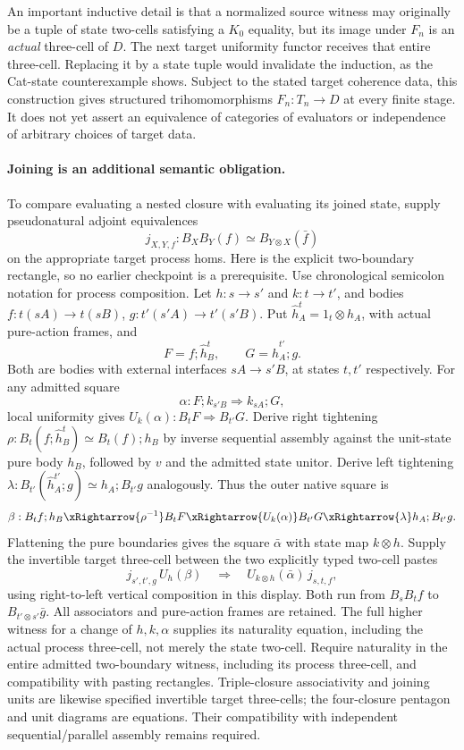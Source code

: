 \documentclass{article}
\begin{document}
An important inductive detail is that a normalized source witness may originally be a tuple of state two-cells satisfying a $K_0$ equality, but its image under $F_n$ is an \emph{actual} three-cell of $D$. The next target uniformity functor receives that entire three-cell. Replacing it by a state tuple would invalidate the induction, as the Cat-state counterexample shows. Subject to the stated target coherence data, this construction gives structured trihomomorphisms $F_n:T_n\to D$ at every finite stage. It does not yet assert an equivalence of categories of evaluators or independence of arbitrary choices of target data.

\paragraph{Joining is an additional semantic obligation.} To compare evaluating a nested closure with evaluating its joined state, supply pseudonatural adjoint equivalences
\[
 j_{X,Y,f}:B_XB_Y(f)\simeq B_{Y\otimes X}(\bar f)
\]
on the appropriate target process homs. Here is the explicit two-boundary rectangle, so no earlier checkpoint is a prerequisite. Use chronological semicolon notation for process composition. Let $h:s\to s'$ and $k:t\to t'$, and bodies $f:t(sA)\to t(sB)$, $g:t'(s'A)\to t'(s'B)$. Put $\widehat h^t_A=1_t\otimes h_A$, with actual pure-action frames, and
\[
 F=f;\widehat h^t_B,\qquad G=\widehat h^{t'}_A;g.
\]
Both are bodies with external interfaces $sA\to s'B$, at states $t,t'$ respectively. For any admitted square
\[
 \alpha:F;k_{s'B}\Rightarrow k_{sA};G,
\]
local uniformity gives $U_k(\alpha):B_tF\Rightarrow B_{t'}G$. Derive right tightening $\rho:B_t(f;\widehat h^t_B)\simeq B_t(f);h_B$ by inverse sequential assembly against the unit-state pure body $h_B$, followed by $v$ and the admitted state unitor. Derive left tightening $\lambda:B_{t'}(\widehat h^{t'}_A;g)\simeq h_A;B_{t'}g$ analogously. Thus the outer native square is
\[
 \beta: B_tf;h_B\xRightarrow{\rho^{-1}}B_tF
 \xRightarrow{U_k(\alpha)}B_{t'}G
 \xRightarrow{\lambda}h_A;B_{t'}g.
\]
Flattening the pure boundaries gives the square $\bar\alpha$ with state map $k\otimes h$. Supply the invertible target three-cell between the two explicitly typed two-cell pastes
\[
 j_{s',t',g}\,U_h(\beta)
 \quad\Longrightarrow\quad
 U_{k\otimes h}(\bar\alpha)\,j_{s,t,f},
\]
using right-to-left vertical composition in this display. Both run from $B_sB_tf$ to $B_{t'\otimes s'}\bar g$. All associators and pure-action frames are retained. The full higher witness for a change of $h,k,\alpha$ supplies its naturality equation, including the actual process three-cell, not merely the state two-cell. Require naturality in the entire admitted two-boundary witness, including its process three-cell, and compatibility with pasting rectangles. Triple-closure associativity and joining units are likewise specified invertible target three-cells; the four-closure pentagon and unit diagrams are equations. Their compatibility with independent sequential/parallel assembly remains required.
\end{document}

